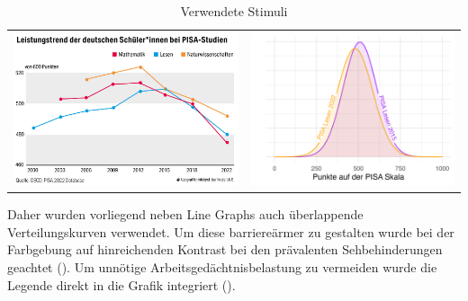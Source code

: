 \documentclass[
  jou,
  floatsintext,
  longtable,
  nolmodern,
  notxfonts,
  notimes,
  colorlinks=true,linkcolor=blue,citecolor=blue,urlcolor=blue]{apa7}
\begin{document}
\begin{ThreePartTable}

\begin{longtable}[]{@{}
  >{\raggedright\arraybackslash}p{}
  >{\raggedright\arraybackslash}p{}@{}}
\caption{Verwendete Stimuli}\label{tbl-materials}\tabularnewline
\toprule\noalign{}
\endfirsthead
\endhead
\bottomrule\noalign{}
\endlastfoot
\includegraphics[width=4.16667in,height=\textheight,keepaspectratio]{img/taz.jpeg}
&
\includegraphics[width=3.78125in,height=\textheight,keepaspectratio]{img/geomtextline.png} \\
\end{longtable}

\end{ThreePartTable}

Daher wurden vorliegend neben Line Graphs auch überlappende
Verteilungskurven verwendet. Um diese barriereärmer zu gestalten wurde
bei der Farbgebung auf hinreichenden Kontrast bei den prävalenten
Sehbehinderungen geachtet (). Um unnötige Arbeitsgedächtnisbelastung zu vermeiden wurde die
Legende direkt in die Grafik integriert
().
\end{document}
